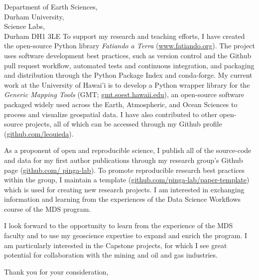 \documentclass[11pt]{letter}
\begin{document}
\begin{letter}{
        Department of Earth Sciences,  \\
        Durham University, \\
        Science Labs, \\
        Durham DH1 3LE
}
To support my research and teaching efforts, I have created the open-source
Python library \textit{Fatiando a Terra}
(\href{http://www.fatiando.org/}{www.fatiando.org}).
The project uses software development best practices, such as version control
and the Github pull request workflow,
automated tests and continuous integration,
and packaging and distribution through the Python Package Index and
conda-forge.
My current work at the University of Hawai'i is to develop a Python wrapper
library for the \textit{Generic Mapping Tools}
(GMT; \href{http://gmt.soest.hawaii.edu/}{gmt.soest.hawaii.edu}),
an open-source software packaged widely used across the Earth, Atmospheric, and
Ocean Sciences to process and visualize geospatial data.
I have also contributed to other open-source projects, all of which can be
accessed through my Github profile
(\href{https://github.com/leouieda/}{github.com/leouieda}).

As a proponent of open and reproducible science, I publish all of the
source-code and data for my first author publications through my research
group's Github page
(\href{https://github.com/pinga-lab}{github.com/ pinga-lab}).
To promote reproducible research best practices within the group,
I maintain a template
(\href{https://github.com/pinga-lab/paper-template}{github.com/pinga-lab/paper-template})
which is used for creating new research projects.
I am interested in exchanging information and learning from the experiences of
the Data Science Workflows course of the MDS program.


I look forward to the opportunity to learn from the experience of the MDS
faculty and to use my geoscience expertise to expand and enrich the program.
I am particularly interested in the Capstone projects, for which I see great
potential for collaboration with the mining and oil and gas industries.

\closing{Thank you for your consideration,}


\end{letter}
\end{document}
